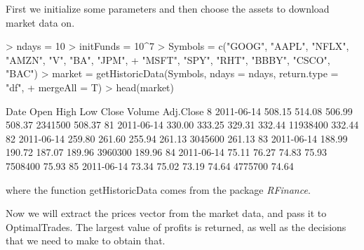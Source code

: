 \documentclass{article}
\begin{document}
First we initialize some parameters and then choose the assets to download 
market data on.

\begin{Schunk}
\begin{Sinput}
> ndays = 10
> initFunds = 10^7
> Symbols = c("GOOG", "AAPL", "NFLX", "AMZN", "V", "BA", "JPM", 
+     "MSFT", "SPY", "RHT", "BBBY", "CSCO", "BAC")
> market = getHistoricData(Symbols, ndays = ndays, return.type = "df", 
+     mergeAll = T)
> head(market)
\end{Sinput}
\begin{Soutput}
         Date   Open   High    Low  Close   Volume Adj.Close
8  2011-06-14 508.15 514.08 506.99 508.37  2341500    508.37
81 2011-06-14 330.00 333.25 329.31 332.44 11938400    332.44
82 2011-06-14 259.80 261.60 255.94 261.13  3045600    261.13
83 2011-06-14 188.99 190.72 187.07 189.96  3960300    189.96
84 2011-06-14  75.11  76.27  74.83  75.93  7508400     75.93
85 2011-06-14  73.34  75.02  73.19  74.64  4775700     74.64
\end{Soutput}
\end{Schunk}

where the function getHistoricData comes from the package \textit{RFinance}.

Now we will extract the prices vector from the market data, and pass it to 
OptimalTrades.  The largest value of profits is returned, as well as the decisions
that we need to make to obtain that.
\end{document}
